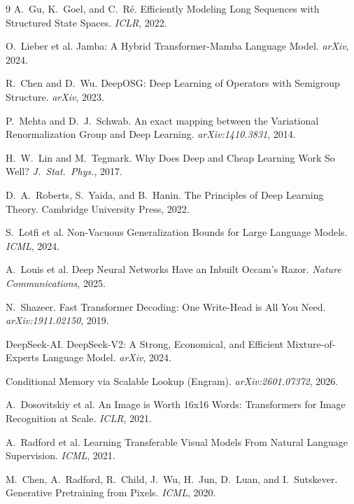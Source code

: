\documentclass[11pt, a4paper]{article}
\theoremstyle{remark}
\begin{document}
\begin{thebibliography}{9}
A.~Gu, K.~Goel, and C.~R\'{e}.
\newblock Efficiently Modeling Long Sequences with Structured State Spaces.
\newblock \emph{ICLR}, 2022.

O.~Lieber et al.
\newblock Jamba: A Hybrid Transformer-Mamba Language Model.
\newblock \emph{arXiv}, 2024.

R.~Chen and D.~Wu.
\newblock DeepOSG: Deep Learning of Operators with Semigroup Structure.
\newblock \emph{arXiv}, 2023.

P.~Mehta and D.~J.~Schwab.
\newblock An exact mapping between the Variational Renormalization Group and Deep Learning.
\newblock \emph{arXiv:1410.3831}, 2014.

H.~W.~Lin and M.~Tegmark.
\newblock Why Does Deep and Cheap Learning Work So Well?
\newblock \emph{J.\ Stat.\ Phys.}, 2017.

D.~A.~Roberts, S.~Yaida, and B.~Hanin.
\newblock The Principles of Deep Learning Theory.
\newblock Cambridge University Press, 2022.

S.~Lotfi et al.
\newblock Non-Vacuous Generalization Bounds for Large Language Models.
\newblock \emph{ICML}, 2024.

A.~Louis et al.
\newblock Deep Neural Networks Have an Inbuilt Occam's Razor.
\newblock \emph{Nature Communications}, 2025.

N.~Shazeer.
\newblock Fast Transformer Decoding: One Write-Head is All You Need.
\newblock \emph{arXiv:1911.02150}, 2019.

DeepSeek-AI.
\newblock DeepSeek-V2: A Strong, Economical, and Efficient Mixture-of-Experts Language Model.
\newblock \emph{arXiv}, 2024.

Conditional Memory via Scalable Lookup (Engram).
\newblock \emph{arXiv:2601.07372}, 2026.


A.~Dosovitskiy et al.
\newblock An Image is Worth 16x16 Words: Transformers for Image Recognition at Scale.
\newblock \emph{ICLR}, 2021.

A.~Radford et al.
\newblock Learning Transferable Visual Models From Natural Language Supervision.
\newblock \emph{ICML}, 2021.

M.~Chen, A.~Radford, R.~Child, J.~Wu, H.~Jun, D.~Luan, and I.~Sutskever.
\newblock Generative Pretraining from Pixels.
\newblock \emph{ICML}, 2020.


\end{thebibliography}
\end{document}
